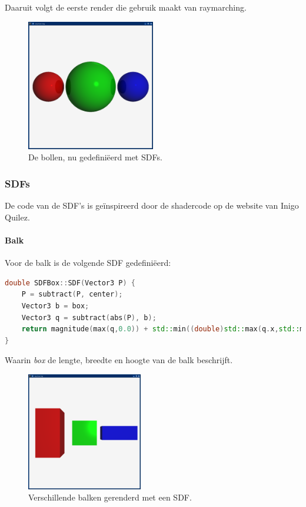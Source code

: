 \documentclass[12pt, a4paper]{article}
\begin{document}
Daaruit volgt de eerste render die gebruik maakt van raymarching.

\begin{figure}[H]
    \centering
    \includegraphics[width=0.50\textwidth]{renders/first_raymarched.png}
    \caption{De bollen, nu gedefiniëerd met SDFs.}
    \label{fig:first_raymarched}
\end{figure}

\clearpage

\subsubsection{SDFs}

De code van de SDF's is geïnspireerd door de shadercode op de website van Inigo Quilez\cite{SDFs}.

\paragraph{Balk}
Voor de balk is de volgende SDF gedefiniëerd:
\begin{lstlisting}[language=C++]
double SDFBox::SDF(Vector3 P) {
    P = subtract(P, center);
    Vector3 b = box;
    Vector3 q = subtract(abs(P), b);
    return magnitude(max(q,0.0)) + std::min((double)std::max(q.x,std::max(q.y,q.z)),0.0);
}
\end{lstlisting}
Waarin \emph{box} de lengte, breedte en hoogte van de balk beschrijft.

\begin{figure}[H]
    \centering
    \includegraphics[width=0.45\textwidth]{renders/boxes.png}
    \caption{Verschillende balken gerenderd met een SDF.}
    \label{fig:boxes}
\end{figure}
\end{document}

